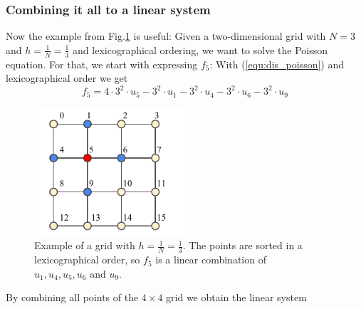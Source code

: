 \subsubsection*{Combining it all to a linear system}
Now the example from Fig.\ref{fig:nat_order_2} is useful: Given a two-dimensional grid with $N = 3$ and $h = \frac{1}{N} = \frac{1}{3}$ and lexicographical ordering, we want to solve the Poisson equation. For that, we start with expressing $f_5$: With (\ref{equ:dis_poisson}) and lexicographical order we get 
\begin{equation}
f_5 = 4 \cdot 3^2 \cdot u_5 - 3^2 \cdot u_1 - 3^2 \cdot u_4  - 3^2 \cdot u_6 - 3^2 \cdot u_9
\end{equation}






\begin{figure}[h]
	\centering
	\includegraphics[width=0.5\textwidth]{chapters/chapter01/linear_order_2.pdf}
	\caption{Example of a grid with $h=\frac{1}{N} = \frac{1}{3}$. The points are sorted in a lexicographical order, so $f_5$ is a linear combination of $u_1, u_4, u_5, u_6 \textrm{ and } u_9$.}
	\label{fig:nat_order_2}
\end{figure}



By combining all points of the $4\times 4$ grid we obtain the linear system

